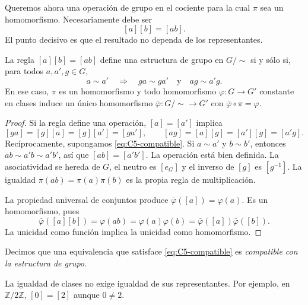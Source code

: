 Queremos ahora una operación de grupo en el cociente para la cual $\pi$ sea un homomorfismo. Necesariamente debe ser
\[
[a][b]=[ab].
\]
El punto decisivo es que el resultado no dependa de los representantes.

\begin{prop}\label{prop:C5-compatible}
La regla $[a][b]=[ab]$ define una estructura de grupo en $G/{\sim}$ si y sólo si, para todos $a,a',g\in G$,
\begin{equation}\label{eq:C5-compatible}
a\sim a'\quad\Longrightarrow\quad
ga\sim ga'\quad\text{y}\quad ag\sim a'g.
\end{equation}
En ese caso, $\pi$ es un homomorfismo y todo homomorfismo $\varphi:G\to G'$ constante en clases induce un único homomorfismo $\bar\varphi:G/{\sim}\to G'$ con $\bar\varphi\circ\pi=\varphi$.
\end{prop}
\begin{proof}
Si la regla define una operación, $[a]=[a']$ implica
\[
[ga]=[g][a]=[g][a']=[ga'],\qquad
[ag]=[a][g]=[a'][g]=[a'g].
\]
Recíprocamente, supongamos \eqref{eq:C5-compatible}. Si $a\sim a'$ y $b\sim b'$, entonces $ab\sim a'b\sim a'b'$, así que $[ab]=[a'b']$. La operación está bien definida. La asociatividad se hereda de $G$, el neutro es $[e_G]$ y el inverso de $[g]$ es $[g^{-1}]$. La igualdad $\pi(ab)=\pi(a)\pi(b)$ es la propia regla de multiplicación.

La propiedad universal de conjuntos produce $\bar\varphi([a])=\varphi(a)$. Es un homomorfismo, pues
\[
\bar\varphi([a][b])=\varphi(ab)
=\varphi(a)\varphi(b)=\bar\varphi([a])\bar\varphi([b]).
\]
La unicidad como función implica la unicidad como homomorfismo.
\end{proof}
Decimos que una equivalencia que satisface \eqref{eq:C5-compatible} es \emph{compatible con la estructura de grupo}.
\begin{obs}
La igualdad de clases no exige igualdad de sus representantes. Por ejemplo, en $\mathbb Z/2\mathbb Z$, $[0]=[2]$ aunque $0\ne2$.
\end{obs}

